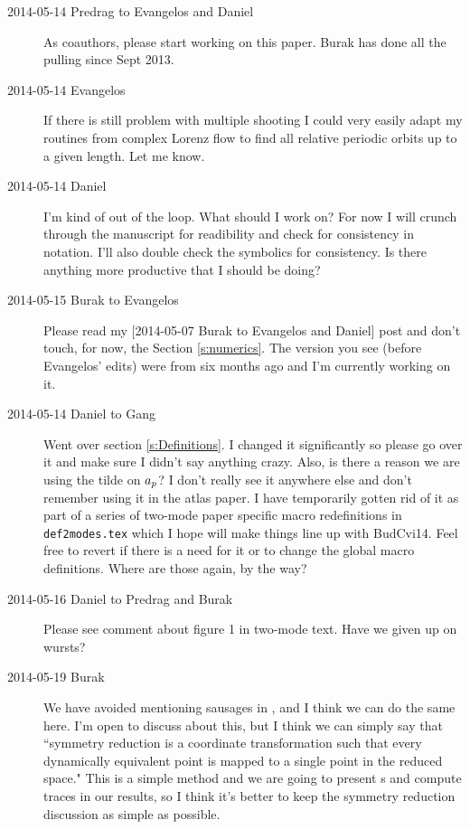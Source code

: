 \begin{description}
\item[2014-05-14 Predrag to Evangelos and Daniel] As coauthors, please start
working on this paper. Burak has done all the pulling since Sept 2013.

\item[2014-05-14 Evangelos] If there is still problem with multiple shooting
I could very easily adapt my routines from complex Lorenz flow to find
all relative periodic orbits up to a given length. Let me know.

\item[2014-05-14 Daniel] I'm kind of out of the loop. What should I work on?
For now I will crunch through the manuscript for readibility and check for
consistency in notation. I'll also double check the symbolics for consistency.
Is there anything more productive that I should be doing?

\item[2014-05-15 Burak to Evangelos] Please read my
[2014-05-07 Burak to Evangelos and Daniel] post and don't touch, for now,
the Section \ref{s:numerics}. The version you see (before Evangelos' edits)
were from six months ago and I'm currently working on it.

\item[2014-05-14 Daniel to Gang] Went over section \ref{s:Definitions}. I changed it significantly so please go over it
and make sure I didn't say anything crazy. Also, is there a reason we are using the tilde on $a_{p}$? I don't really
see it anywhere else and don't remember using it in the atlas paper. I have temporarily gotten rid of it as part of a series
of two-mode paper specific macro redefinitions in \texttt{def2modes.tex} which I hope will make things line up with BudCvi14.
Feel free to revert if there is a need for it or to change the global macro definitions. Where are those again, by the way?

\item[2014-05-16 Daniel to Predrag and Burak] Please see comment about figure 1 in two-mode text. Have we given up on wursts?

\item[2014-05-19 Burak] We have avoided mentioning sausages in ,
and I think we can do the same here. I'm open to discuss about this, but I think
we can simply say that ``symmetry reduction is a coordinate transformation such
that every dynamically equivalent point is mapped to a single point in the reduced
space." This is a simple method and we are going to present \rpo s and compute
traces in our results, so I think it's better to keep the symmetry reduction
discussion as simple as possible.


\end{description}
